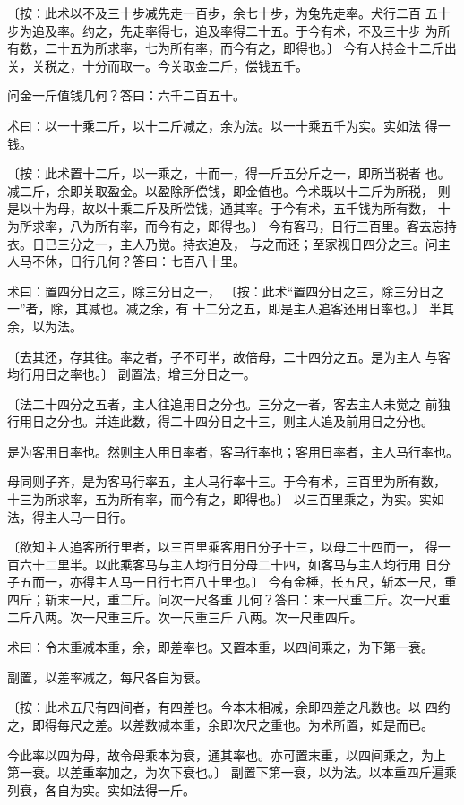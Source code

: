 \documentclass[a4paper,12pt,UTF8,twoside]{ctexbook}
\begin{document}
〔按：此术以不及三十步减先走一百步，余七十步，为兔先走率。犬行二百 五十步为追及率。约之，先走率得七，追及率得二十五。于今有术，不及三十步 为所有数，二十五为所求率，七为所有率，而今有之，即得也。〕 今有人持金十二斤出关，关税之，十分而取一。今关取金二斤，偿钱五千。

问金一斤值钱几何？答曰：六千二百五十。

术曰：以一十乘二斤，以十二斤减之，余为法。以一十乘五千为实。实如法 得一钱。

〔按：此术置十二斤，以一乘之，十而一，得一斤五分斤之一，即所当税者 也。减二斤，余即关取盈金。以盈除所偿钱，即金值也。今术既以十二斤为所税， 则是以十为母，故以十乘二斤及所偿钱，通其率。于今有术，五千钱为所有数， 十为所求率，八为所有率，而今有之，即得也。〕 今有客马，日行三百里。客去忘持衣。日已三分之一，主人乃觉。持衣追及， 与之而还；至家视日四分之三。问主人马不休，日行几何？答曰：七百八十里。

术曰：置四分日之三，除三分日之一， 〔按：此术“置四分日之三，除三分日之一”者，除，其减也。减之余，有 十二分之五，即是主人追客还用日率也。〕 半其余，以为法。

〔去其还，存其往。率之者，子不可半，故倍母，二十四分之五。是为主人 与客均行用日之率也。〕 副置法，增三分日之一。

〔法二十四分之五者，主人往追用日之分也。三分之一者，客去主人未觉之 前独行用日之分也。并连此数，得二十四分日之十三，则主人追及前用日之分也。

是为客用日率也。然则主人用日率者，客马行率也；客用日率者，主人马行率也。

母同则子齐，是为客马行率五，主人马行率十三。于今有术，三百里为所有数， 十三为所求率，五为所有率，而今有之，即得也。〕 以三百里乘之，为实。实如法，得主人马一日行。

〔欲知主人追客所行里者，以三百里乘客用日分子十三，以母二十四而一， 得一百六十二里半。以此乘客马与主人均行日分母二十四，如客马与主人均行用 日分子五而一，亦得主人马一日行七百八十里也。〕 今有金棰，长五尺，斩本一尺，重四斤；斩末一尺，重二斤。问次一尺各重 几何？答曰：末一尺重二斤。次一尺重二斤八两。次一尺重三斤。次一尺重三斤 八两。次一尺重四斤。

术曰：令末重减本重，余，即差率也。又置本重，以四间乘之，为下第一衰。

副置，以差率减之，每尺各自为衰。

〔按：此术五尺有四间者，有四差也。今本末相减，余即四差之凡数也。以 四约之，即得每尺之差。以差数减本重，余即次尺之重也。为术所置，如是而已。

今此率以四为母，故令母乘本为衰，通其率也。亦可置末重，以四间乘之，为上 第一衰。以差重率加之，为次下衰也。〕 副置下第一衰，以为法。以本重四斤遍乘列衰，各自为实。实如法得一斤。
\end{document}
